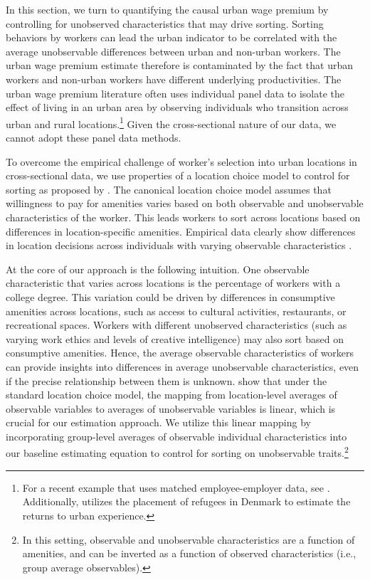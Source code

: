 \documentclass[12pt]{article}
\begin{document}
In this section, we turn to quantifying the causal urban wage premium by controlling for unobserved characteristics that may drive sorting.
Sorting behaviors by workers can lead the urban indicator to be correlated with the average unobservable differences between urban and non-urban workers.
The urban wage premium estimate therefore is contaminated by the fact that urban workers and non-urban workers have different underlying productivities. 
The urban wage premium literature often uses individual panel data to isolate the effect of living in an urban area by observing individuals who transition across urban and rural locations.\footnote{
  For a recent example that uses matched employee-employer data, see \citet{FRINGS2022103786}.
  Additionally, \citet{eckert2022return} utilizes the placement of refugees in Denmark to estimate the returns to urban experience.
} 
Given the cross-sectional nature of our data, we cannot adopt these panel data methods.

To overcome the empirical challenge of worker's selection into urban locations in cross-sectional data, we use properties of a location choice model to control for sorting as proposed by \citet{altonji2018estimating}. 
The canonical location choice model assumes that willingness to pay for amenities varies based on both observable and unobservable characteristics of the worker.  
This leads workers to sort across locations based on differences in location-specific amenities.
Empirical data clearly show differences in location decisions across individuals with varying observable characteristics \citep[e.g.][]{Diamond_2016}.

At the core of our approach is the following intuition.
One observable characteristic that varies across locations is the percentage of workers with a college degree.
This variation could be driven by differences in consumptive amenities across locations, such as access to cultural activities, restaurants, or recreational spaces.
Workers with different unobserved characteristics (such as varying work ethics and levels of creative intelligence) may also sort based on consumptive amenities.
Hence, the average observable characteristics of workers can provide insights into differences in average unobservable characteristics, even if the precise relationship between them is unknown. 
\citet{altonji2018estimating} show that under the standard location choice model, the mapping from location-level averages of observable variables to averages of unobservable variables is linear, which is crucial for our estimation approach.
We utilize this linear mapping by incorporating group-level averages of observable individual characteristics into our baseline estimating equation to control for sorting on unobservable traits.\footnote{
  In this setting, observable and unobservable characteristics are a function of amenities, and  can be inverted as a function of observed characteristics (i.e., group average observables).
}
\end{document}
